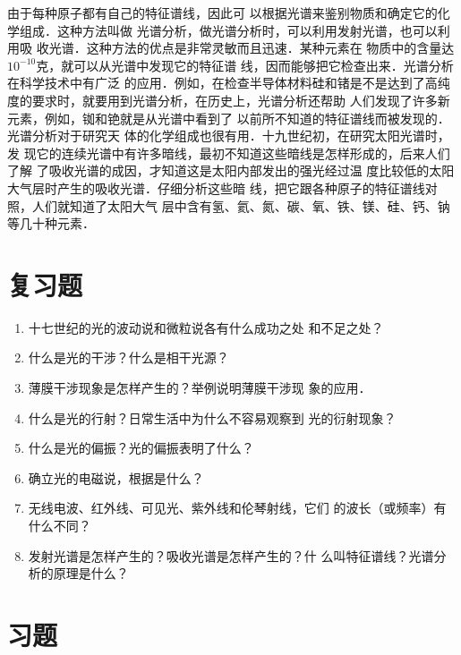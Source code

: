 由于每种原子都有自己的特征谱线，因此可
以根据光谱来鉴别物质和确定它的化学组成．这种方法叫做
光谱分析，做光谱分析时，可以利用发射光谱，也可以利用吸
收光谱．这种方法的优点是非常灵敏而且迅速．某种元素在
物质中的含量达$10^{-10}$克，就可以从光谱中发现它的特征谱
线，因而能够把它检查出来．光谱分析在科学技术中有广泛
的应用．例如，在检查半导体材料硅和锗是不是达到了高纯
度的要求时，就要用到光谱分析，在历史上，光谱分析还帮助
人们发现了许多新元素，例如，铷和铯就是从光谱中看到了
以前所不知道的特征谱线而被发现的．光谱分析对于研究天
体的化学组成也很有用．十九世纪初，在研究太阳光谱时，发
现它的连续光谱中有许多暗线，最初不知道这些暗线是怎样形成的，后来人们了解
了吸收光谱的成因，才知道这是太阳内部发出的强光经过温
度比较低的太阳大气层时产生的吸收光谱．仔细分析这些暗
线，把它跟各种原子的特征谱线对照，人们就知道了太阳大气
层中含有氢、氦、氮、碳、氧、铁、镁、硅、钙、钠等几十种元素．

\section*{复习题}
\begin{enumerate}
\item 十七世纪的光的波动说和微粒说各有什么成功之处
和不足之处？
\item 什么是光的干涉？什么是相干光源？
\item 薄膜干涉现象是怎样产生的？举例说明薄膜干涉现
象的应用．
\item 什么是光的行射？日常生活中为什么不容易观察到
光的衍射现象？
\item 什么是光的偏振？光的偏振表明了什么？
\item 确立光的电磁说，根据是什么？
\item 无线电波、红外线、可见光、紫外线和伦琴射线，它们
的波长（或频率）有什么不同？
\item 发射光谱是怎样产生的？吸收光谱是怎样产生的？什
么叫特征谱线？光谱分析的原理是什么？
\end{enumerate}

\section*{习题}

